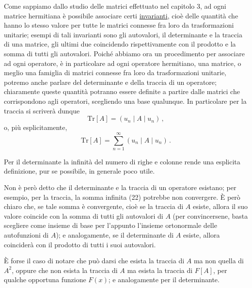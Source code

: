 \documentclass[11pt, a4paper]{book}
\numberwithin{equation}{section}
\begin{document}
Come sappiamo dallo studio delle matrici effettuato nel capitolo 3, ad ogni matrice hermitiana è possibile associare certi \underline{invarianti}, cioè delle quantità che hanno lo stesso valore per tutte le matrici connesse fra loro da trasformazioni unitarie; esempi di tali invarianti sono gli autovalori, il determinante e la traccia di una matrice, gli ultimi due coincidendo rispettivamente con il prodotto e la somma di tutti gli autovalori. Poiché abbiamo ora un procedimento per associare ad ogni operatore, è in particolare ad ogni operatore hermitiano, una matrice, o meglio una famiglia di matrici connesse fra loro da trasformazioni unitarie, potremo anche parlare del determinante e della traccia di un operatore; chiaramente queste quantità potranno essere definite a partire dalle matrici che corrispondono agli operatori, scegliendo una base qualunque. In particolare per la traccia si scriverà dunque
\begin{equation}
\mathrm{Tr}[A]=(u_n\mid A\mid u_n)\,, \tag{22a}
\end{equation}
o, più esplicitamente,
\begin{equation}
\mathrm{Tr}[A]=\sum_{n=1}^{\infty}(u_n\mid A\mid u_n)\,. \tag{22b}
\end{equation}

Per il determinante la infinità del numero di righe e colonne rende una esplicita definizione, pur se possibile, in generale poco utile.

Non è però detto che il determinante e la traccia di un operatore esistano; per esempio, per la traccia, la somma infinita (22) potrebbe non convergere. È però chiaro che, se tale somma è convergente, cioè se la traccia di $A$ esiste, allora il suo valore coincide con la somma di tutti gli autovalori di $A$ (per convincersene, basta scegliere come insieme di base per l'appunto l'insieme ortonormale delle autofunzioni di $A$); e analogamente, se il determinante di $A$ esiste, allora coinciderà con il prodotto di tutti i suoi autovalori.

È forse il caso di notare che può darsi che esista la traccia di $A$ ma non quella di $A^2$, oppure che non esista la traccia di $A$ ma esista la traccia di $F[A]$, per qualche opportuna funzione $F(x)$; e analogamente per il determinante.
\end{document}
